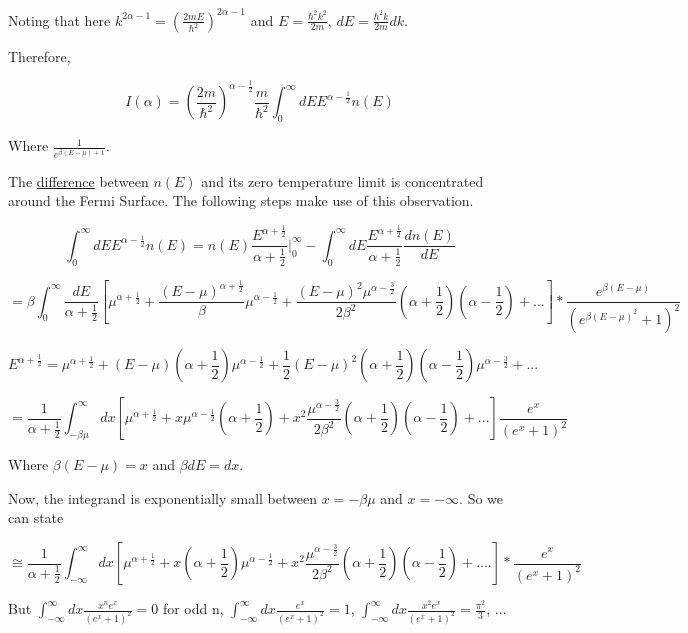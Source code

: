 \documentclass{article}
\begin{document}
Noting that here $k^{2\alpha-1}=(\frac{2mE}{\hbar^{2}})^{2\alpha-1}$ and $E=\frac{\hbar^{2}k^{2}}{2m}$, $dE=\frac{\hbar^{2}k}{2m}dk$.

Therefore,

$$I(\alpha)=(\frac{2m}{\hbar^{2}})^{\alpha-\frac{1}{2}}\frac{m}{\hbar^{2}}\int_{0}^{\infty}dEE^{\alpha-\frac{1}{2}}n(E)$$

Where $\frac{1}{e^{\beta(E-\mu)+1}}$.

The \underline{difference} between $n(E)$ and its zero temperature limit is concentrated around the Fermi Surface.  The following steps make use of this observation.


$$\int_{0}^{\infty}dEE^{\alpha-\frac{1}{2}}n(E)=n(E)\frac{E^{\alpha+\frac{1}{2}}}{\alpha+\frac{1}{2}}\vert_{0}^{\infty}-\int_{0}^{\infty}dE\frac{E^{\alpha+\frac{1}{2}}}{\alpha+\frac{1}{2}}\frac{dn(E)}{dE}$$

$$=\beta\int_{0}^{\infty}\frac{dE}{\alpha+\frac{1}{2}}[\mu^{\alpha+\frac{1}{2}}+\frac{(E-\mu)^{\alpha+\frac{1}{2}}}{\beta}\mu^{\alpha-\frac{1}{2}}+\frac{(E-\mu)^{2}\mu^{\alpha-\frac{3}{2}}}{2\beta^{2}}(\alpha+\frac{1}{2})(\alpha-\frac{1}{2})+...]*\frac{e^{\beta(E-\mu)}}{(e^{\beta(E-\mu)^{2}}+1)^{2}}$$

$$E^{\alpha+\frac{1}{2}}=\mu^{\alpha+\frac{1}{2}}+(E-\mu)(\alpha+\frac{1}{2})\mu^{\alpha-\frac{1}{2}}+\frac{1}{2}(E-\mu)^{2}(\alpha+\frac{1}{2})(\alpha-\frac{1}{2})\mu^{\alpha-\frac{3}{2}}+...$$

$$=\frac{1}{\alpha+\frac{1}{2}}\int_{-\beta\mu}^{\infty}dx[\mu^{\alpha+\frac{1}{2}}+x\mu^{\alpha-\frac{1}{2}}(\alpha+\frac{1}{2})+x^{2}\frac{\mu^{\alpha-\frac{3}{2}}}{2\beta^{2}}(\alpha+\frac{1}{2})(\alpha-\frac{1}{2})+...]\frac{e^{x}}{(e^{x}+1)^{2}}$$

Where $\beta(E-\mu)=x$ and $\beta dE=dx$.

Now, the integrand is exponentially small between $x=-\beta\mu$ and $x=-\infty$.  So we can state

$$\cong\frac{1}{\alpha+\frac{1}{2}}\int_{-\infty}^{\infty}dx[\mu^{\alpha+\frac{1}{2}}+x(\alpha+\frac{1}{2})\mu^{\alpha-\frac{1}{2}}+x^{2}\frac{\mu^{\alpha-\frac{3}{2}}}{2\beta^{2}}(\alpha+\frac{1}{2})(\alpha-\frac{1}{2})+....]*\frac{e^{x}}{(e^{x}+1)^{2}}
$$

But $\int_{-\infty}^{\infty}dx\frac{x^{n}e^{x}}{(e^{x}+1)^{2}}=0$ for odd n, $\int_{-\infty}^{\infty}dx\frac{e^{x}}{(e^{x}+1)^{2}}=1$, $\int_{-\infty}^{\infty}dx\frac{x^{2}e^{x}}{(e^{x}+1)^{2}}=\frac{\pi^{2}}{3}$, ...
\end{document}
